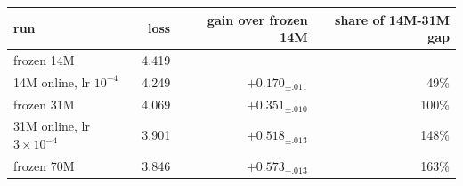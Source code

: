 \begin{tabular}{lrrr}
\toprule
run & loss & gain over frozen 14M & share of 14M-31M gap \\
\midrule
frozen 14M & 4.419 &  &  \\
14M online, lr $10^{-4}$ & 4.249 & $+0.170_{\pm .011}$ & 49\% \\
frozen 31M & 4.069 & $+0.351_{\pm .010}$ & 100\% \\
31M online, lr $3\!\times\!10^{-4}$ & 3.901 & $+0.518_{\pm .013}$ & 148\% \\
frozen 70M & 3.846 & $+0.573_{\pm .013}$ & 163\% \\
\bottomrule
\end{tabular}
